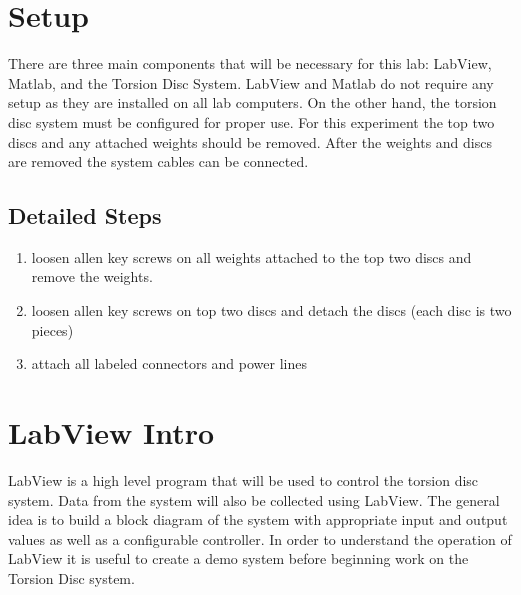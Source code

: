\documentclass[11pt,titlepage]{article}
\begin{document}
\section{Setup}
    There are three main components that will be necessary for this lab: LabView, Matlab, and the Torsion Disc System. LabView and Matlab do not require any setup as they are installed on all lab computers. On the other hand, the torsion disc system must be configured for proper use. For this experiment the top two discs and any attached weights should be removed. After the weights and discs are removed the system cables can be connected.
    \subsection*{Detailed Steps}
    \begin{enumerate}
        \item loosen allen key screws on all weights attached to the top two discs and remove the weights.
        \item loosen allen key screws on top two discs and detach the discs (each disc is two pieces)
        \item attach all labeled connectors and power lines
    \end{enumerate}

\section{LabView Intro}
    LabView is a high level program that will be used to control the torsion disc system. Data from the system will also be collected using LabView. The general idea is to build a block diagram of the system with appropriate input and output values as well as a configurable controller. In order to understand the operation of LabView it is useful to create a demo system before beginning work on the Torsion Disc system.
\end{document}
